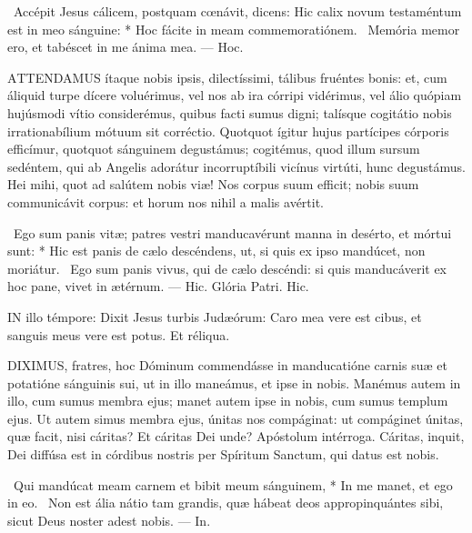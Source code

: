 \R\ Accépit Jesus cálicem, postquam cœnávit, dicens: Hic calix novum testaméntum est in meo sánguine: * Hoc fácite in meam commemoratiónem. \V\ Memória memor ero, et tabéscet in me ánima mea. --- Hoc.


\lettrine[lines=2]{A}{TTENDAMUS} ítaque nobis ipsis, dilectíssimi, tálibus fruéntes bonis: et, cum áliquid turpe dícere voluérimus, vel nos ab ira córripi vidérimus, vel álio quópiam hujúsmodi vítio considerémus, quibus facti sumus digni; talísque cogitátio nobis irrationabílium mótuum sit corréctio. Quotquot ígitur hujus partícipes córporis efficímur, quotquot sánguinem degustámus; cogitémus, quod illum sursum sedéntem, qui ab Angelis adorátur incorruptíbili vicínus virtúti, hunc degustámus. Hei mihi, quot ad salútem nobis viæ! Nos corpus suum efficit; nobis suum communicávit corpus: et horum nos nihil a malis avértit.

\R\ Ego sum panis vitæ; patres vestri manducavérunt manna in desérto, et mórtui sunt: * Hic est panis de cælo descéndens, ut, si quis ex ipso mandúcet, non moriátur. \V\ Ego sum panis vivus, qui de cælo descéndi: si quis manducáverit ex hoc pane, vivet in ætérnum. --- Hic. Glória Patri. Hic.




\lettrine[lines=2]{I}{N} illo témpore: Dixit Jesus turbis Judæórum: Caro mea vere est cibus, et sanguis meus vere est potus. Et réliqua.



\lettrine[lines=2]{D}{IXIMUS}, fratres, hoc Dóminum commendásse in manducatióne carnis suæ et potatióne sánguinis sui, ut in illo maneámus, et ipse in nobis. Manémus autem in illo, cum sumus membra ejus; manet autem ipse in nobis, cum sumus templum ejus. Ut autem simus membra ejus, únitas nos compáginat: ut compáginet únitas, quæ facit, nisi cáritas? Et cáritas Dei unde? Apóstolum intérroga. Cáritas, inquit, Dei diffúsa est in córdibus nostris per Spíritum Sanctum, qui datus est nobis.

\R\ Qui mandúcat meam carnem et bibit meum sánguinem, * In me manet, et ego in eo. \V\ Non est ália nátio tam grandis, quæ hábeat deos appropinquántes sibi, sicut Deus noster adest nobis. --- In.

